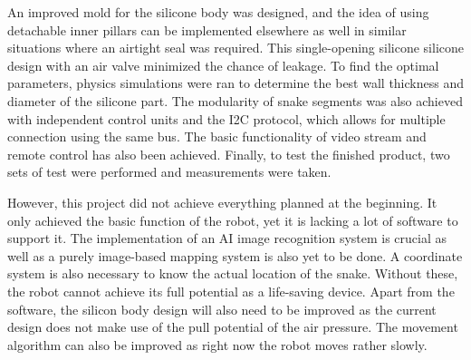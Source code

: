 \documentclass[twoside, 11pt]{article}
\begin{document}
 An improved mold for the silicone body was designed, and the idea of using detachable inner pillars can be implemented elsewhere as well in similar situations where an airtight seal was required. This single-opening silicone silicone design with an air valve minimized the chance of leakage. To find the optimal parameters, physics simulations were ran to determine the best wall thickness and diameter of the silicone part. The modularity of snake segments was also achieved with independent control units and the I2C protocol, which allows for multiple connection using the same bus. The basic functionality of video stream and remote control has also been achieved. Finally, to test the finished product, two sets of test were performed and measurements were taken. 

However, this project did not achieve everything planned at the beginning. It only achieved the basic function of the robot, yet it is lacking a lot of software to support it. The implementation of an AI image recognition system is crucial as well as a purely image-based mapping system is also yet to be done. A coordinate system is also necessary to know the actual location of the snake. Without these, the robot cannot achieve its full potential as a life-saving device. Apart from the software, the silicon body design will also need to be improved as the current design does not make use of the pull potential of the air pressure. The movement algorithm can also be improved as right now the robot moves rather slowly.





\newpage	
\printbibliography

\end{document}
